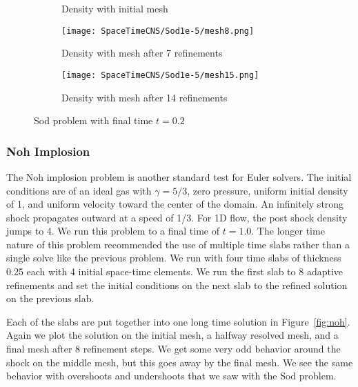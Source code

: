 \documentclass[Dissertation.tex]{subfiles}
\begin{document}
\begin{figure}[p]
\begin{subfigure}[c]{0.45\textwidth}
\caption{Density with initial mesh}
\label{fig:sod_mesh0}
\end{subfigure}
\begin{subfigure}[c]{0.45\textwidth}
\centering
\texttt{[image: SpaceTimeCNS/Sod1e-5/mesh8.png]}
\caption{Density with mesh after 7 refinements}
\label{fig:sod_mesh7}
\end{subfigure}
\begin{subfigure}[c]{0.9\textwidth}
\centering
\texttt{[image: SpaceTimeCNS/Sod1e-5/mesh15.png]}
\caption{Density with mesh after 14 refinements}
\label{fig:sod_mesh14}
\end{subfigure}
\caption{Sod problem with final time $t=0.2$}
\label{fig:sod}
\end{figure}

\subsubsection{Noh Implosion}
The Noh implosion problem\cite{Noh1987} is another standard test for Euler solvers.
The initial conditions are of an ideal gas with $\gamma=5/3$, zero pressure, uniform initial density of 1, 
and uniform velocity toward the center of the domain.
An infinitely strong shock propagates outward at a speed of 1/3.
For 1D flow, the post shock density jumps to 4.
We run this problem to a final time of $t=1.0$.
The longer time nature of this problem recommended the use of multiple time slabs rather than a single solve like the previous problem.
We run with four time slabs of thickness 0.25 each with 4 initial space-time elements.
We run the first slab to 8 adaptive refinements and set the initial conditions on the next slab to the refined solution on the previous slab.

Each of the slabs are put together into one long time solution in Figure~\ref{fig:noh}. 
Again we plot the solution on the initial mesh, a halfway resolved mesh, and a final mesh after 8 refinement steps.
We get some very odd behavior around the shock on the middle mesh, but this goes away by the final mesh.
We see the same behavior with overshoots and undershoots that we saw with the Sod problem. 
\end{document}
